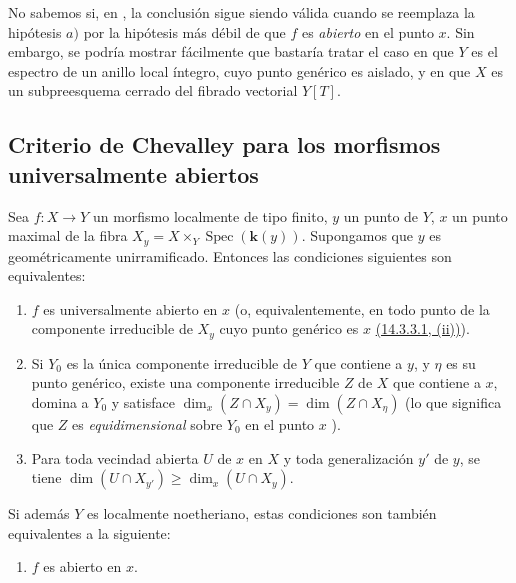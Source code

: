 \begin{remark}[14.3.14]
\label{IV.14.3.14}
No sabemos si, en , la conclusión sigue siendo válida cuando se reemplaza la hipótesis $a)$ por la hipótesis más débil de que $f$ es \emph{abierto} en el punto $x$.
Sin embargo, se podría mostrar fácilmente que bastaría tratar el caso en que $Y$ es el espectro de un anillo local íntegro, cuyo punto genérico es aislado, y en que $X$ es un subpreesquema cerrado del fibrado vectorial $Y[T]$.
\end{remark}
\subsection{Criterio de Chevalley para los morfismos universalmente abiertos}
\label{subsection:IV.14.4}

\begin{theorem}[14.4.1]
\label{IV.14.4.1}
Sea $f:X\to Y$ un morfismo localmente de tipo finito, $y$ un punto de $Y$, $x$ un punto maximal de la fibra $X_y=X\times_Y\operatorname{Spec}(\boldsymbol{k}(y))$.
Supongamos que $y$ es \textup{geométricamente unirramificado}.
Entonces las condiciones siguientes son equivalentes:
\begin{enumerate}[label=\emph{\alph*)}]
  \item $f$ es universalmente abierto en $x$ \textup{(o, equivalentemente, en todo punto de la componente irreducible de $X_y$ cuyo punto genérico es $x$ {\hyperlink{ega4.c04.subsec.14-3-3-1}{(14.3.3.1, (ii))}})}.
  \item Si $Y_0$ es la única componente irreducible de $Y$ que contiene a $y$, y $\eta$ es su punto genérico, existe una componente irreducible $Z$ de $X$ que contiene a $x$, domina a $Y_0$ y satisface $\dim_x(Z\cap X_y)=\dim(Z\cap X_\eta)$ \textup{(lo que significa que $Z$ es \emph{equidimensional} sobre $Y_0$ en el punto $x$ )}.
  \item[\emph{b$'$)}] Para toda vecindad abierta $U$ de $x$ en $X$ y toda generalización $y'$ de $y$, se tiene $\dim(U\cap X_{y'})\geq\dim_x(U\cap X_y)$.
\end{enumerate}
Si además $Y$ es localmente noetheriano, estas condiciones son también equivalentes a la siguiente:
\begin{enumerate}[label=\emph{\alph*)}]
  \item[\emph{c)}] $f$ es abierto en $x$.
\end{enumerate}
\end{theorem}

